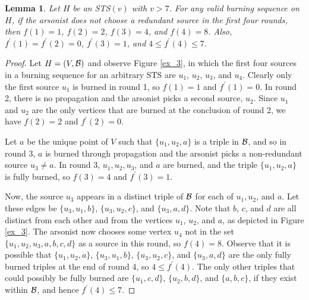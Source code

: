 \documentclass[12pt]{article}
\newtheorem{lemma}[theorem]{Lemma}
\theoremstyle{definition}
\numberwithin{table}{section}
\begin{document}
\begin{lemma}
\label{first4rounds}
Let $H$ be an STS$(v)$ with $v > 7$. For any valid  burning sequence on $H$, if the arsonist does not choose a redundant source in the first four rounds, then $f(1)=1$, $f(2)=2$, $f(3)=4$, and $f(4)=8$. Also, $f^\prime(1)=f^\prime(2)=0$, $f^\prime(3)=1$, and $4\leq f^\prime(4)\leq7$.
\end{lemma}

\begin{proof}
Let $H=(V,{\cal B})$ and
observe Figure \ref{ex_3}, in which the first four sources in a burning sequence for an arbitrary STS are $u_1$, $u_2$, $u_3$, and $u_4$. Clearly only the first source $u_1$ is burned in round 1, so $f(1)=1$ and $f^\prime(1)=0$. In round 2, there is no propagation and the arsonist picks a second source, $u_2$. Since $u_1$ and $u_2$ are the only vertices that are burned at the conclusion of round 2, we have $f(2)=2$ and $f^\prime(2)=0$. 

Let $a$ be the unique point of $V$ such that $\{u_1,u_2,a\}$ is a triple in ${\cal B}$, and so in round $3$, $a$ is burned through propagation and the arsonist picks a non-redundant source $u_3 \neq a$. In round 3, $u_1,u_2,u_3$, and $a$ are burned, and the triple $\{u_1,u_2,a\}$ is fully burned, so $f(3)=4$ and $f^\prime(3)=1$. 

Now, the source $u_3$ appears in a distinct triple of ${\cal B}$ for each of $u_1,u_2$, and $a$. Let these edges be $\{u_3,u_1,b\}$, $\{u_3,u_2,c\}$, and $\{u_3,a,d\}$. Note that $b$, $c$, and $d$ are all distinct from each other and from the vertices $u_1$, $u_2$, and $a$, as depicted in Figure \ref{ex_3}. The arsonist now chooses some vertex $u_4$ not in the set $\{ u_1,u_2,u_3,a,b,c, d\}$ as a source in this round, so $f(4)=8$. Observe that it is possible that $\{u_1,u_2,a\}$, $\{u_3,u_1,b\}$, $\{u_3,u_2,c\}$, and $\{u_3,a,d\}$ are the only fully burned triples at the end of round 4, so $4\leq f^\prime(4)$. 
The only other triples that could possibly be fully burned are  
$\{u_1,c,d\}$, $\{u_2,b,d\}$, and $\{a,b,c\}$, if they exist within $\cal B$,
 and hence $f^\prime(4)\leq7$.
\end{proof}
\end{document}
